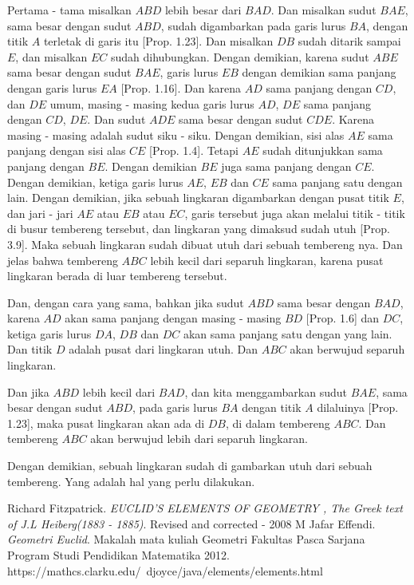 \documentclass[a4paper]{book}
\begin{document}
Pertama - tama misalkan $ABD$ lebih besar dari $BAD$. Dan misalkan sudut 
$BAE$, sama besar dengan sudut $ABD$, sudah digambarkan pada garis lurus
$BA$, dengan titik $A$ terletak di garis itu [Prop. 1.23]. Dan misalkan
$DB$ sudah ditarik sampai $E$, dan misalkan $EC$ sudah dihubungkan. Dengan
demikian, karena sudut $ABE$ sama besar dengan sudut $BAE$, garis lurus $EB$
dengan demikian sama panjang dengan garis lurus $EA$ [Prop. 1.16]. Dan karena
$AD$ sama panjang dengan $CD$, dan $DE$ umum, masing - masing kedua garis 
lurus $AD$, $DE$ sama panjang dengan $CD$, $DE$. Dan sudut $ADE$ sama besar
dengan sudut $CDE$. Karena masing - masing adalah sudut siku - siku. Dengan
demikian, sisi alas $AE$ sama panjang dengan sisi alas $CE$ [Prop. 1.4]. 
Tetapi $AE$ sudah ditunjukkan sama panjang dengan $BE$. Dengan demikian $BE$
juga sama panjang dengan $CE$. Dengan demikian, ketiga garis lurus $AE$, $EB$
dan $CE$ sama panjang satu dengan lain. Dengan demikian, jika sebuah lingkaran
digambarkan dengan pusat titik $E$, dan jari - jari  $AE$ atau $EB$ atau $EC$,
garis tersebut juga akan melalui titik - titik di busur tembereng tersebut, 
dan lingkaran yang dimaksud sudah utuh [Prop. 3.9]. Maka sebuah lingkaran
sudah dibuat utuh dari sebuah tembereng nya. Dan jelas bahwa tembereng $ABC$
lebih kecil dari separuh lingkaran, karena pusat lingkaran berada di luar
tembereng tersebut.

Dan, dengan cara yang sama, bahkan jika sudut $ABD$ sama besar dengan $BAD$,
karena $AD$ akan sama panjang dengan masing - masing $BD$ [Prop. 1.6] dan $DC$,
ketiga garis lurus $DA$, $DB$ dan $DC$ akan sama panjang satu dengan yang lain.
Dan titik $D$ adalah pusat dari lingkaran utuh. Dan $ABC$ akan berwujud separuh
lingkaran.

Dan jika $ABD$ lebih kecil dari $BAD$, dan kita menggambarkan sudut $BAE$, sama
besar dengan sudut $ABD$, pada garis lurus $BA$ dengan titik $A$ dilaluinya
[Prop. 1.23], maka pusat lingkaran akan ada di $DB$, di dalam tembereng $ABC$.
Dan tembereng $ABC$ akan berwujud lebih dari separuh lingkaran.

Dengan demikian, sebuah lingkaran sudah di gambarkan utuh dari sebuah tembereng.
Yang adalah hal yang perlu dilakukan.


\begin{thebibliography}{9}
Richard Fitzpatrick.
\textit{EUCLID’S ELEMENTS OF GEOMETRY , The Greek text of J.L Heiberg(1883 - 1885)}.
Revised and corrected - 2008 
M Jafar Effendi.
\textit{Geometri Euclid}.
Makalah mata kuliah Geometri Fakultas Pasca Sarjana Program Studi Pendidikan Matematika 2012.
https://mathcs.clarku.edu/~djoyce/java/elements/elements.html 
\end{thebibliography}
\end{document}
